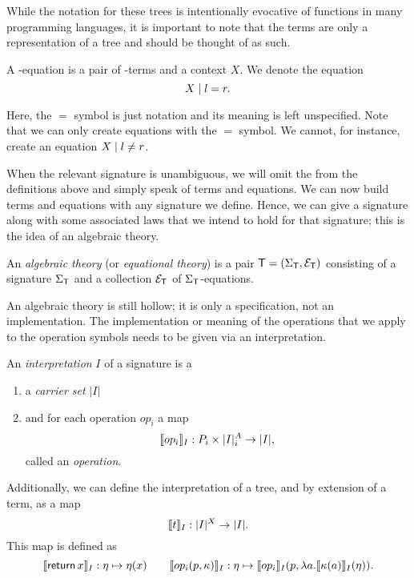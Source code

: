 While the notation for these trees is intentionally evocative of functions in many programming languages, it is important to note that the terms are only a representation of a tree and should be thought of as such.

\begin{definition}
    A \Sig-equation is a pair of \Sig-terms and a context $X$. We denote the equation
    \[ X \;|\; l = r. \]
\end{definition}

Here, the $=$ symbol is just notation and its meaning is left unspecified. Note that we can only create equations with the $=$ symbol. We cannot, for instance, create an equation $X \;|\; l \neq r$.

When the relevant signature \Sig is unambiguous, we will omit the \Sig from the definitions above and simply speak of terms and equations. We can now build terms and equations with any signature we define. Hence, we can give a signature along with some associated laws that we intend to hold for that signature; this is the idea of an algebraic theory.

\begin{definition}
    An \emph{algebraic theory} (or \emph{equational theory}) is a pair $\mathsf{T} = (\Sigma_\mathsf{T}, \mathcal{E}_\mathsf{T})$ consisting of a signature $\Sigma_\mathsf{T}$ and a collection $\mathcal{E}_\mathsf{T}$ of $\Sigma_\mathsf{T}$-equations.
\end{definition}

An algebraic theory is still hollow; it is only a specification, not an implementation. The implementation or meaning of the operations that we apply to the operation symbols needs to be given via an interpretation.

\begin{definition}[Interpretation]
    An \emph{interpretation} $I$ of a signature \Sig is a
    \begin{enumerate}
    \item a \emph{carrier set} $|I|$
    \item and for each operation $op_i$ a map
        \[ \llbracket op_i\rrbracket_I : P_i \times |I|^A_i \to |I|, \]
        called an \emph{operation}.
    \end{enumerate}
    Additionally, we can define the interpretation of a tree, and by extension of a term, as a map
    \[ \llbracket t\rrbracket_I : |I|^X \to |I|. \]
    This map is defined as
    \[
        \llbracket\operatorname{\mathsf{return}} x\rrbracket_I : \eta \mapsto \eta(x)
        \qquad
        \llbracket op_i(p,\kappa)\rrbracket_I : \eta \mapsto \llbracket op_i\rrbracket_I(p, \lambda a. \llbracket\kappa(a)\rrbracket_I(\eta)).
    \]
\end{definition}

